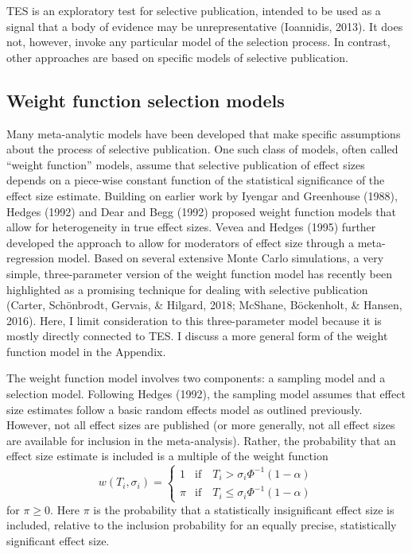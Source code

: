 \documentclass[man,floatsintext]{apa6}
\begin{document}
TES is an exploratory test for selective publication, intended to be used as a signal that a body of evidence may be unrepresentative (Ioannidis, 2013). It does not, however, invoke any particular model of the selection process. In contrast, other approaches are based on specific models of selective publication.

\hypertarget{weight-function-selection-models}{%
\subsection{Weight function selection models}\label{weight-function-selection-models}}

Many meta-analytic models have been developed that make specific assumptions about the process of selective publication.
One such class of models, often called \enquote{weight function} models, assume that selective publication of effect sizes depends on a piece-wise constant function of the statistical significance of the effect size estimate.
Building on earlier work by Iyengar and Greenhouse (1988), Hedges (1992) and Dear and Begg (1992) proposed weight function models that allow for heterogeneity in true effect sizes.
Vevea and Hedges (1995) further developed the approach to allow for moderators of effect size through a meta-regression model.
Based on several extensive Monte Carlo simulations, a very simple, three-parameter version of the weight function model has recently been highlighted as a promising technique for dealing with selective publication (Carter, Schönbrodt, Gervais, \& Hilgard, 2018; McShane, Böckenholt, \& Hansen, 2016).
Here, I limit consideration to this three-parameter model because it is mostly directly connected to TES.
I discuss a more general form of the weight function model in the Appendix.

The weight function model involves two components: a sampling model and a selection model. Following Hedges (1992), the sampling model assumes that effect size estimates follow a basic random effects model as outlined previously. However, not all effect sizes are published (or more generally, not all effect sizes are available for inclusion in the meta-analysis). Rather, the probability that an effect size estimate is included is a multiple of the weight function
\begin{equation}
w(T_i, \sigma_i) = \begin{cases} 1 & \text{if} \quad T_i > \sigma_i \Phi^{-1}(1 - \alpha) \\ \pi & \text{if} \quad T_i \leq \sigma_i \Phi^{-1}(1 - \alpha) \end{cases}
\label{eq:weight-function}
\end{equation}
for \(\pi \geq 0\). Here \(\pi\) is the probability that a statistically insignificant effect size is included, relative to the inclusion probability for an equally precise, statistically significant effect size.
\end{document}
